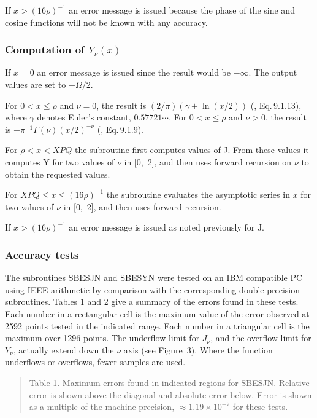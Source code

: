 \documentclass[twoside]{MATH77}
\begin{document}
If $x > (16\rho )^{-1}$ an error message is issued
because the phase of the sine and cosine functions will not be known with
any accuracy.

\subsubsection{Computation of $Y_\nu (x)$}

If $x = 0$ an error message is issued since the result would be $-\infty $.
The output values are set to $-\Omega /2.$

For $0 < x \leq \rho $ and $\nu = 0$, the result is $(2/\pi ) (\gamma +\ln
(x/2))$ (\cite{ams55:bes}, Eq.\,9.1.13), where $\gamma $ denotes Euler's
constant, $0.57721\cdots$.  For $0 < x \leq \rho $ and $\nu > 0$, the result is
$-\pi ^{-1} \Gamma (\nu ) (x/2)^{-\nu }$ (\cite{ams55:bes}, Eq.\,9.1.9).

For $\rho < x < \mathit{XPQ}$ the subroutine first computes values of J. From
these values it computes Y for two values of $\nu $ in [0,~2], and then uses
forward recursion on $\nu $ to obtain the requested values.

For $\mathit{XPQ} \leq x \leq (16\rho )^{-1}$ the subroutine evaluates the
asymptotic series in $x$ for two values of $\nu $ in [0,~2], and then uses
forward recursion.

If $x > (16\rho )^{-1}$ an error message is issued as noted
previously for J.

\subsubsection{Accuracy tests}

The subroutines SBESJN and SBESYN were tested on an
IBM compatible PC using IEEE arithmetic by comparison with
the corresponding double precision subroutines.  Tables 1 and
2 give a summary of the errors found in these tests.  Each
number in a rectangular cell is the maximum value of the
error observed at 2592 points tested in the indicated range.
Each number in a triangular cell is the maximum over 1296
points.  The underflow limit for $J_{\nu}$, and the overflow
limit for $Y_{\nu}$, actually extend down the $\nu $ axis
(see Figure~3).  Where the function underflows or overflows,
fewer samples are used.

\begin{quote}Table 1. Maximum errors found in indicated regions for SBESJN.
Relative error is shown above the diagonal and absolute error below. Error
is shown as a multiple of the machine precision, $\approx 1.19
\times 10^{-7}$ for these tests.
\end{quote}\vspace{10pt}
\end{document}
